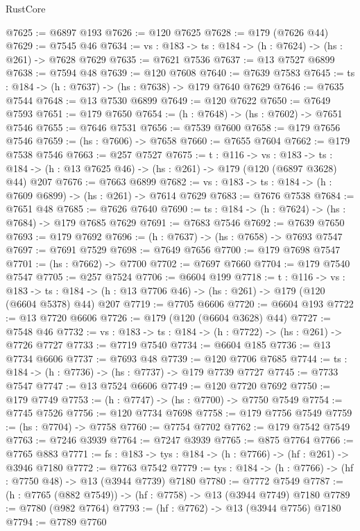 \begin{lexlean}{RustCore}
\begin{coremodule}
@7625 := @6897 @193
@7626 := @120 @7625
@7628 := @179 (@7626 @44)
@7629 := @7545 @46
@7634 := {vs : @183} -> {ts : @184} -> (h : @7624) -> (hs : @261) -> @7628 @7629
@7635 := @7621 @7536
@7637 := @13 @7527 @6899
@7638 := @7594 @48
@7639 := @120 @7608
@7640 := @7639 @7583
@7645 := {ts : @184} -> (h : @7637) -> (hs : @7638) -> @179 @7640 @7629
@7646 := @7635 @7544
@7648 := @13 @7530 @6899
@7649 := @120 @7622
@7650 := @7649 @7593
@7651 := @179 @7650
@7654 := (h : @7648) -> (hs : @7602) -> @7651 @7546
@7655 := @7646 @7531
@7656 := @7539 @7600
@7658 := @179 @7656 @7546
@7659 := (hs : @7606) -> @7658
@7660 := @7655 @7604
@7662 := @179 @7538 @7546
@7663 := @257 @7527
@7675 := {t : @116} ->
  {vs : @183} ->
  {ts : @184} -> (h : @13 @7625 @46) -> (hs : @261) -> @179 (@120 (@6897 @3628) @44) @207
@7676 := @7663 @6899
@7682 := {vs : @183} -> {ts : @184} -> (h : @7609 @6899) -> (hs : @261) -> @7614 @7629
@7683 := @7676 @7538
@7684 := @7651 @48
@7685 := @7626 @7640
@7690 := {ts : @184} -> (h : @7624) -> (hs : @7684) -> @179 @7685 @7629
@7691 := @7683 @7546
@7692 := @7639 @7650
@7693 := @179 @7692
@7696 := (h : @7637) -> (hs : @7658) -> @7693 @7547
@7697 := @7691 @7529
@7698 := @7649 @7656
@7700 := @179 @7698 @7547
@7701 := (hs : @7662) -> @7700
@7702 := @7697 @7660
@7704 := @179 @7540 @7547
@7705 := @257 @7524
@7706 := @6604 @199
@7718 := {t : @116} ->
  {vs : @183} ->
  {ts : @184} -> (h : @13 @7706 @46) -> (hs : @261) -> @179 (@120 (@6604 @5378) @44) @207
@7719 := @7705 @6606
@7720 := @6604 @193
@7722 := @13 @7720 @6606
@7726 := @179 (@120 (@6604 @3628) @44)
@7727 := @7548 @46
@7732 := {vs : @183} -> {ts : @184} -> (h : @7722) -> (hs : @261) -> @7726 @7727
@7733 := @7719 @7540
@7734 := @6604 @185
@7736 := @13 @7734 @6606
@7737 := @7693 @48
@7739 := @120 @7706 @7685
@7744 := {ts : @184} -> (h : @7736) -> (hs : @7737) -> @179 @7739 @7727
@7745 := @7733 @7547
@7747 := @13 @7524 @6606
@7749 := @120 @7720 @7692
@7750 := @179 @7749
@7753 := (h : @7747) -> (hs : @7700) -> @7750 @7549
@7754 := @7745 @7526
@7756 := @120 @7734 @7698
@7758 := @179 @7756 @7549
@7759 := (hs : @7704) -> @7758
@7760 := @7754 @7702
@7762 := @179 @7542 @7549
@7763 := @7246 @3939
@7764 := @7247 @3939
@7765 := @875 @7764
@7766 := @7765 @883
@7771 := {fs : @183} -> {tys : @184} -> (h : @7766) -> (hf : @261) -> @3946 @7180
@7772 := @7763 @7542
@7779 := {tys : @184} -> (h : @7766) -> (hf : @7750 @48) -> @13 (@3944 @7739) @7180
@7780 := @7772 @7549
@7787 := (h : @7765 (@882 @7549)) -> (hf : @7758) -> @13 (@3944 @7749) @7180
@7789 := @7780 (@982 @7764)
@7793 := (hf : @7762) -> @13 (@3944 @7756) @7180
@7794 := @7789 @7760

\end{coremodule}
\end{lexlean}

